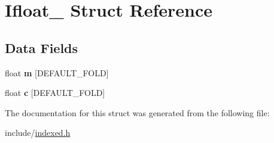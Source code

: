 \hypertarget{struct_ifloat__}{}\section{Ifloat\+\_\+ Struct Reference}
\label{struct_ifloat__}
\subsection*{Data Fields}
\begin{DoxyCompactItemize}
\item 
\hypertarget{struct_ifloat___a3bed255ac60fd8e250055524d20145fa}{}float {\bfseries m} \mbox{[}D\+E\+F\+A\+U\+L\+T\+\_\+\+F\+O\+L\+D\mbox{]}\label{struct_ifloat___a3bed255ac60fd8e250055524d20145fa}

\item 
\hypertarget{struct_ifloat___af00a64d4f9764a3496cddb177617235a}{}float {\bfseries c} \mbox{[}D\+E\+F\+A\+U\+L\+T\+\_\+\+F\+O\+L\+D\mbox{]}\label{struct_ifloat___af00a64d4f9764a3496cddb177617235a}

\end{DoxyCompactItemize}


The documentation for this struct was generated from the following file\+:\begin{DoxyCompactItemize}
\item 
include/\hyperlink{indexed_8h}{indexed.\+h}\end{DoxyCompactItemize}
